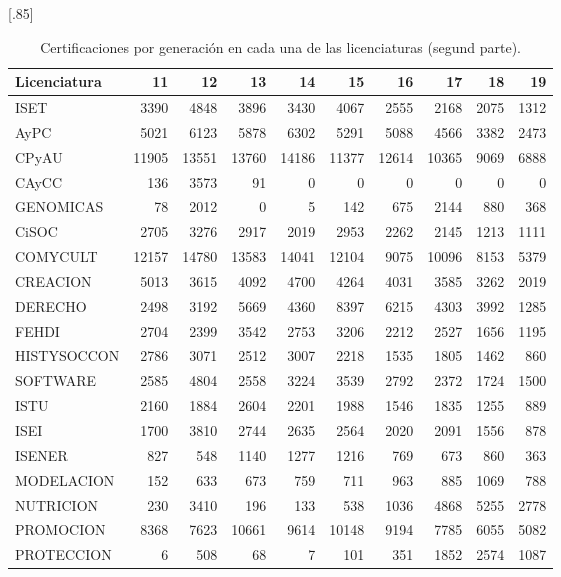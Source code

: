 \documentclass[12pt]{article}
\begin{document}
\begin{table}[ht!]
\centering
\scalebox{0.75}[.85]{
\begin{tabular}{lrrrrrrrrr}
  \hline
  \hline  
Licenciatura & 11 & 12 & 13 & 14 & 15 & 16 & 17 & 18 & 19 \\ 
  \hline\hline
ISET & 3390 & 4848 & 3896 & 3430 & 4067 & 2555 & 2168 & 2075 & 1312 \\ 
  AyPC & 5021 & 6123 & 5878 & 6302 & 5291 & 5088 & 4566 & 3382 & 2473 \\ 
  CPyAU & 11905 & 13551 & 13760 & 14186 & 11377 & 12614 & 10365 & 9069 & 6888\\ 
  CAyCC &  136 & 3573 &  91 &   0 &   0 &   0 &   0 &   0 &   0 \\ 
  GENOMICAS &  78 & 2012 &   0 &   5 & 142 & 675 & 2144 & 880 & 368\\ 
  CiSOC &  2705 & 3276 & 2917 & 2019 & 2953 & 2262 & 2145 & 1213 & 1111\\ 
  COMYCULT & 12157 & 14780 & 13583 & 14041 & 12104 & 9075 & 10096 & 8153 & 5379\\ 
  CREACION & 5013 & 3615 & 4092 & 4700 & 4264 & 4031 & 3585 & 3262 & 2019\\ 
  DERECHO &  2498 & 3192 & 5669 & 4360 & 8397 & 6215 & 4303 & 3992 & 1285\\ 
  FEHDI & 2704 & 2399 & 3542 & 2753 & 3206 & 2212 & 2527 & 1656 & 1195\\ 
  HISTYSOCCON & 2786 & 3071 & 2512 & 3007 & 2218 & 1535 & 1805 & 1462 & 860\\ 
  SOFTWARE & 2585 & 4804 & 2558 & 3224 & 3539 & 2792 & 2372 & 1724 & 1500\\ 
  ISTU & 2160 & 1884 & 2604 & 2201 & 1988 & 1546 & 1835 & 1255 & 889\\ 
  ISEI & 1700 & 3810 & 2744 & 2635 & 2564 & 2020 & 2091 & 1556 & 878\\ 
  ISENER &827 & 548 & 1140 & 1277 & 1216 & 769 & 673 & 860 & 363\\ 
  MODELACION & 152 & 633 & 673 & 759 & 711 & 963 & 885 & 1069 & 788\\ 
  NUTRICION & 230 & 3410 & 196 & 133 & 538 & 1036 & 4868 & 5255 & 2778\\ 
  PROMOCION & 8368 & 7623 & 10661 & 9614 & 10148 & 9194 & 7785 & 6055 & 5082\\ 
  PROTECCION &  6 & 508 &  68 &   7 & 101 & 351 & 1852 & 2574 & 1087\\ 
   \hline
\end{tabular}
}
\caption{\label{Prob_Cert_Lic_Gen2}Certificaciones por generaci\'on en cada una de las licenciaturas (segund parte).}
\end{table}
\end{document}
